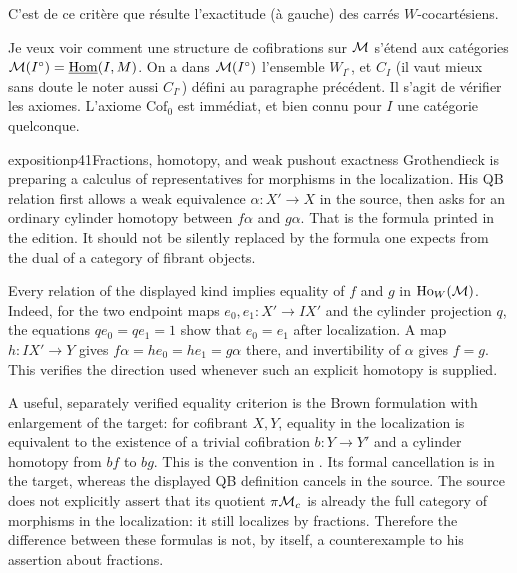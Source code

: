 C'est de ce critère que résulte l'exactitude (à gauche) des carrés $W$-cocartésiens.

Je veux voir comment une structure de cofibrations sur $\mathcal{M}$ s'étend aux catégories $\mathcal{M}(I^\circ) = \underline{\mathrm{Hom}}(I, M)$. On a dans $\mathcal{M}(I^\circ)$  l'ensemble $W_{I^\circ}$, et $C_I$ (il vaut mieux sans doute le noter aussi $C_{I^\circ}$) défini au paragraphe précédent. Il s'agit de vérifier les axiomes. L'axiome $\mathrm{Cof}_0$ est immédiat, et bien connu pour $I$ une catégorie quelconque. %

\begin{dcomment}{exposition}{p41}{Fractions, homotopy, and weak pushout exactness}
Grothendieck is preparing a calculus of representatives for morphisms in the localization. His QB relation first allows a weak equivalence $\alpha:X'\to X$ in the source, then asks for an ordinary cylinder homotopy between $f\alpha$ and $g\alpha$. That is the formula printed in the edition. It should not be silently replaced by the formula one expects from the dual of a category of fibrant objects.

Every relation of the displayed kind implies equality of $f$ and $g$ in $\operatorname{Ho}_W(\mathcal{M})$. Indeed, for the two endpoint maps $e_0,e_1:X'\to IX'$ and the cylinder projection $q$, the equations $qe_0=qe_1=1$ show that $e_0=e_1$ after localization. A map $h:IX'\to Y$ gives $f\alpha=he_0=he_1=g\alpha$ there, and invertibility of $\alpha$ gives $f=g$. This verifies the direction used whenever such an explicit homotopy is supplied.

A useful, separately verified equality criterion is the Brown formulation with enlargement of the target: for cofibrant $X,Y$, equality in the localization is equivalent to the existence of a trivial cofibration $b:Y\to Y'$ and a cylinder homotopy from $bf$ to $bg$. This is the convention in \citet[Section 6.3, diagram (6.1), and Theorem 6.3.1]{RadulescuBanu2009}. Its formal cancellation is in the target, whereas the displayed QB definition cancels in the source. The source does not explicitly assert that its quotient $\pi\mathcal{M}_c$ is already the full category of morphisms in the localization: it still localizes by fractions. Therefore the difference between these formulas is not, by itself, a counterexample to his assertion about fractions.


\end{dcomment}
